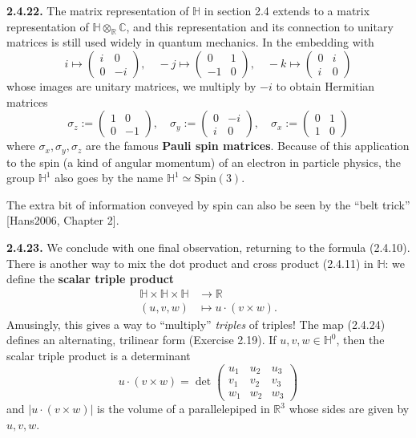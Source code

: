 \documentclass{article}
\theoremstyle{definition}
\begin{document}
\textbf{2.4.22.} The matrix representation of $\mathbb{H}$ in section 2.4 extends to a matrix representation of $\mathbb{H} \otimes_{\mathbb{R}} \mathbb{C}$, and this representation and its connection to unitary matrices is still used widely in quantum mechanics. In the embedding with
$$i \mapsto \begin{pmatrix} i & 0 \\ 0 & -i \end{pmatrix}, \quad -j \mapsto \begin{pmatrix} 0 & 1 \\ -1 & 0 \end{pmatrix}, \quad -k \mapsto \begin{pmatrix} 0 & i \\ i & 0 \end{pmatrix}$$
whose images are unitary matrices, we multiply by $-i$ to obtain Hermitian matrices
$$\sigma_z := \begin{pmatrix} 1 & 0 \\ 0 & -1 \end{pmatrix}, \quad \sigma_y := \begin{pmatrix} 0 & -i \\ i & 0 \end{pmatrix}, \quad \sigma_x := \begin{pmatrix} 0 & 1 \\ 1 & 0 \end{pmatrix}$$
where $\sigma_x, \sigma_y, \sigma_z$ are the famous \textbf{Pauli spin matrices}. Because of this application to the spin (a kind of angular momentum) of an electron in particle physics, the group $\mathbb{H}^1$ also goes by the name $\mathbb{H}^1 \simeq \mathrm{Spin}(3)$.

The extra bit of information conveyed by spin can also be seen by the ``belt trick'' [Hans2006, Chapter 2].

\textbf{2.4.23.} We conclude with one final observation, returning to the formula (2.4.10). There is another way to mix the dot product and cross product (2.4.11) in $\mathbb{H}$: we define the \textbf{scalar triple product}
\begin{equation}
\begin{aligned}
\mathbb{H} \times \mathbb{H} \times \mathbb{H} &\rightarrow \mathbb{R} \\
(u, v, w) &\mapsto u \cdot (v \times w).
\end{aligned} \tag{2.4.24}
\end{equation}
Amusingly, this gives a way to ``multiply'' \emph{triples} of triples! The map (2.4.24) defines an alternating, trilinear form (Exercise 2.19). If $u, v, w \in \mathbb{H}^0$, then the scalar triple product is a determinant
$$u \cdot (v \times w) = \det \begin{pmatrix} u_1 & u_2 & u_3 \\ v_1 & v_2 & v_3 \\ w_1 & w_2 & w_3 \end{pmatrix}$$
and $|u \cdot (v \times w)|$ is the volume of a parallelepiped in $\mathbb{R}^3$ whose sides are given by $u, v, w$.
\end{document}
